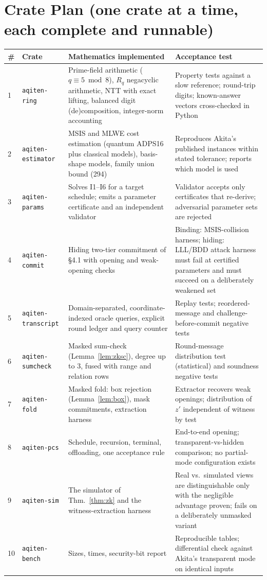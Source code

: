 \documentclass[11pt]{article}
\renewcommand{\_}{\textunderscore\allowbreak{}}
\newcommand{\code}[1]{\texttt{\small #1}}
\theoremstyle{definition}
\begin{document}
\section{Crate Plan (one crate at a time, each complete and runnable)}
\label{sec:crates}
\begin{center}
\small\renewcommand{\arraystretch}{1.18}
\begin{longtable}{@{}p{}p{}p{}p{}@{}}
\toprule
\textbf{\#} & \textbf{Crate} & \textbf{Mathematics implemented} & \textbf{Acceptance test}\\
\midrule
\endhead
1 & \code{aqiten-ring} & Prime-field arithmetic ($q\equiv5\bmod8$), $R_q$ negacyclic arithmetic, NTT with exact lifting, balanced digit (de)composition, integer-norm accounting & Property tests against a slow reference; round-trip digits; known-answer vectors cross-checked in Python\\
2 & \code{aqiten-estimator} & MSIS and MLWE cost estimation (quantum ADPS16 plus classical models), basis-shape models, family union bound (294) & Reproduces Akita's published instances within stated tolerance; reports which model is used\\
3 & \code{aqiten-params} & Solves I1--I6 for a target schedule; emits a parameter certificate and an independent validator & Validator accepts only certificates that re-derive; adversarial parameter sets are rejected\\
4 & \code{aqiten-commit} & Hiding two-tier commitment of \S4.1 with opening and weak-opening checks & Binding: MSIS-collision harness; hiding: LLL/BDD attack harness must fail at certified parameters and must succeed on a deliberately weakened set\\
5 & \code{aqiten-transcript} & Domain-separated, coordinate-indexed oracle queries, explicit round ledger and query counter & Replay tests; reordered-message and challenge-before-commit negative tests\\
6 & \code{aqiten-sumcheck} & Masked sum-check (Lemma~\ref{lem:zksc}), degree up to $3$, fused with range and relation rows & Round-message distribution test (statistical) and soundness negative tests\\
7 & \code{aqiten-fold} & Masked fold: box rejection (Lemma~\ref{lem:box}), mask commitments, extraction harness & Extractor recovers weak openings; distribution of $z'$ independent of witness by test\\
8 & \code{aqiten-pcs} & Schedule, recursion, terminal, offloading, one acceptance rule & End-to-end opening; transparent-vs-hidden comparison; no partial-mode configuration exists\\
9 & \code{aqiten-sim} & The simulator of Thm.~\ref{thm:zk} and the witness-extraction harness & Real vs.\ simulated views are distinguishable only with the negligible advantage proven; fails on a deliberately unmasked variant\\
10 & \code{aqiten-bench} & Sizes, times, security-bit report & Reproducible tables; differential check against Akita's transparent mode on identical inputs\\
\bottomrule
\end{longtable}
\end{center}
\end{document}
